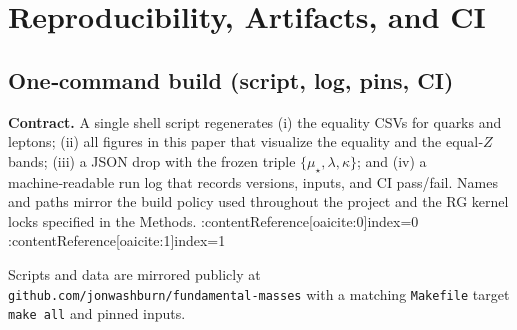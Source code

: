 \documentclass[epjc3]{svjour3}
\begin{document}
\section{Reproducibility, Artifacts, and CI}

\subsection{One‑command build (script, log, pins, CI)}
\noindent\textbf{Contract.} A single shell script regenerates (i) the equality CSVs for quarks and leptons; (ii) all figures in this paper that visualize the equality and the equal‑$Z$ bands; (iii) a JSON drop with the frozen triple $\{\mu_\star,\lambda,\kappa\}$; and (iv) a machine‑readable run log that records versions, inputs, and CI pass/fail. Names and paths mirror the build policy used throughout the project and the RG kernel locks specified in the Methods. :contentReference[oaicite:0]{index=0} :contentReference[oaicite:1]{index=1}

\medskip\noindent Scripts and data are mirrored publicly at \texttt{github.com/jonwashburn/fundamental-masses} \cite{fundamental-masses-repo} with a matching \texttt{Makefile} target \texttt{make all} and pinned inputs.
\end{document}
